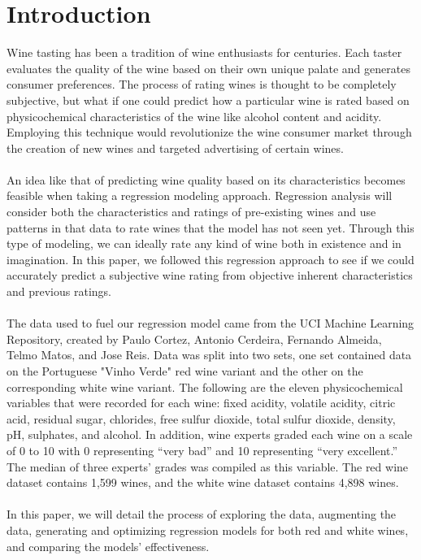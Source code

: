 
\section{Introduction}
\label{sec:intro}

Wine tasting has been a tradition of wine enthusiasts for centuries. Each taster evaluates the quality of the wine based on their own unique palate and generates consumer preferences. The process of rating wines is thought to be completely subjective, but what if one could predict how a particular wine is rated based on physicochemical characteristics of the wine like alcohol content and acidity. Employing this technique would revolutionize the wine consumer market through the creation of new wines and targeted advertising of certain wines. \\\\
An idea like that of predicting wine quality based on its characteristics becomes feasible when taking a regression modeling approach. Regression analysis will consider both the characteristics and ratings of pre-existing wines and use patterns in that data to rate wines that the model has not seen yet. Through this type of modeling, we can ideally rate any kind of wine both in existence and in imagination. In this paper, we followed this regression approach to see if we could accurately predict a subjective wine rating from objective inherent characteristics and previous ratings. \\\\
The data used to fuel our regression model came from the UCI Machine Learning Repository, created by Paulo Cortez, Antonio Cerdeira, Fernando Almeida, Telmo Matos, and Jose Reis. Data was split into two sets, one set contained data on the Portuguese "Vinho Verde" red wine variant and the other on the corresponding white wine variant. The following are the eleven physicochemical variables that were recorded for each wine: fixed acidity, volatile acidity, citric acid, residual sugar, chlorides, free sulfur dioxide, total sulfur dioxide, density, pH, sulphates, and alcohol. In addition, wine experts graded each wine on a scale of 0 to 10 with 0 representing “very bad” and 10 representing “very excellent.” The median of three experts’ grades was compiled as this variable. The red wine dataset contains 1,599 wines, and the white wine dataset contains 4,898 wines. \\\\
In this paper, we will detail the process of exploring the data, augmenting the data, generating and optimizing regression models for both red and white wines, and comparing the models’ effectiveness.
\\


